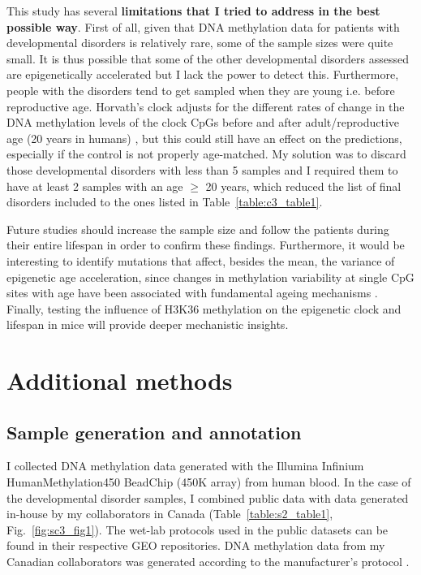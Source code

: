 \bigskip

This study has several \textbf{limitations that I tried to address in the best possible way}. First of all, given that DNA methylation data for patients with developmental disorders is relatively rare, some of the sample sizes were quite small. It is thus possible that some of the other developmental disorders assessed are epigenetically accelerated but I lack the power to detect this. Furthermore, people with the disorders tend to get sampled when they are young i.e. before reproductive age. Horvath's clock adjusts for the different rates of change in the DNA methylation levels of the clock CpGs before and after adult/reproductive age (20 years in humans) \citep{Horvath2013}, but this could still have an effect on the predictions, especially if the control is not properly age-matched. My solution was to discard those developmental disorders with less than 5 samples and I required them to have at least 2 samples with an age $\geq$ 20 years, which reduced the list of final disorders included to the ones listed in Table~\ref{table:c3_table1}. 

\bigskip

Future studies should increase the sample size and follow the patients during their entire lifespan in order to confirm these findings. Furthermore, it would be interesting to identify mutations that affect, besides the mean, the variance of epigenetic age acceleration, since changes in methylation variability at single CpG sites with age have been associated with fundamental ageing mechanisms \citep{Slieker2016}. Finally, testing the influence of H3K36 methylation on the epigenetic clock and lifespan in mice will provide deeper mechanistic insights.

\smallskip

\section{Additional methods} \label{s:3.7}

\subsection*{Sample generation and annotation}

I collected DNA methylation data generated with the Illumina Infinium HumanMethylation450 BeadChip (450K array) from human blood. In the case of the developmental disorder samples, I combined public data with data generated in-house by my collaborators in Canada (Table~\ref{table:s2_table1}, Fig.~\ref{fig:sc3_fig1}). The wet-lab protocols used in the public datasets can be found in their respective GEO repositories. DNA methylation data from my Canadian collaborators was generated according to the manufacturer's protocol \citep{Research,Illumina2015}.

